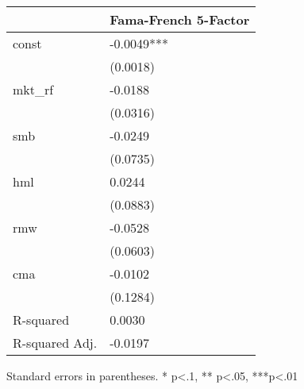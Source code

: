 \begin{table}
\caption{}
\label{}
\begin{center}
\begin{tabular}{ll}
\hline
               & Fama-French 5-Factor  \\
\hline
const          & -0.0049***            \\
               & (0.0018)              \\
mkt\_rf        & -0.0188               \\
               & (0.0316)              \\
smb            & -0.0249               \\
               & (0.0735)              \\
hml            & 0.0244                \\
               & (0.0883)              \\
rmw            & -0.0528               \\
               & (0.0603)              \\
cma            & -0.0102               \\
               & (0.1284)              \\
R-squared      & 0.0030                \\
R-squared Adj. & -0.0197               \\
\hline
\end{tabular}
\end{center}
\end{table}
\bigskip
Standard errors in parentheses. \newline 
* p<.1, ** p<.05, ***p<.01